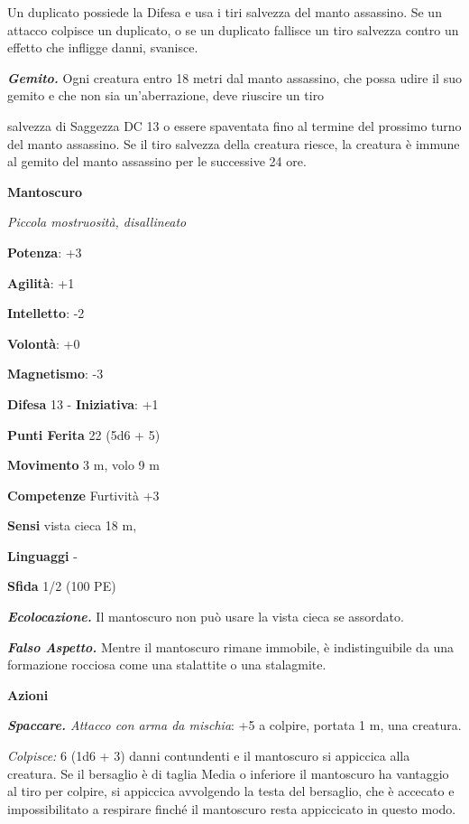 \begin{multicols}{2}
Un duplicato possiede la Difesa e usa i tiri salvezza del manto assassino.
Se un attacco colpisce un duplicato, o se un duplicato fallisce un tiro
salvezza contro un effetto che infligge danni, svanisce.

\emph{\textbf{Gemito.}} Ogni creatura entro 18 metri dal manto
assassino, che possa udire il suo gemito e che non sia un'aberrazione,
deve riuscire un tiro


salvezza di Saggezza DC 13 o essere spaventata fino al termine del
prossimo turno del manto assassino. Se il tiro salvezza della creatura
riesce, la creatura è immune al gemito del manto assassino per le
successive 24 ore.



\textbf{Mantoscuro}

\emph{Piccola mostruosità, disallineato}

\textbf{Potenza}: +3

\textbf{Agilità}: +1

\textbf{Intelletto}: -2

\textbf{Volontà}: +0

\textbf{Magnetismo}: -3

\textbf{Difesa} 13 - \textbf{Iniziativa}: +1

\textbf{Punti Ferita} 22 (5d6 + 5)

\textbf{Movimento} 3 m, volo 9 m

\textbf{Competenze} Furtività +3

\textbf{Sensi} vista cieca 18 m, 

\textbf{Linguaggi} -

\textbf{Sfida} 1/2 (100 PE)\smallskip

\emph{\textbf{Ecolocazione.}} Il mantoscuro non può usare la vista cieca
se assordato.

\emph{\textbf{Falso Aspetto.}} Mentre il mantoscuro rimane immobile, è
indistinguibile da una formazione rocciosa come una stalattite o una
stalagmite.

\smallskip\textbf{Azioni}

\emph{\textbf{Spaccare.} Attacco con arma da mischia}: +5 a colpire,
portata 1 m, una creatura.

\emph{Colpisce:} 6 (1d6 + 3) danni contundenti e il mantoscuro si
appiccica alla creatura. Se il bersaglio è di taglia Media o inferiore
il mantoscuro ha vantaggio al tiro per colpire, si appiccica avvolgendo
la testa del bersaglio, che è accecato e impossibilitato a respirare
finché il mantoscuro resta appiccicato in questo modo.


\end{multicols}
